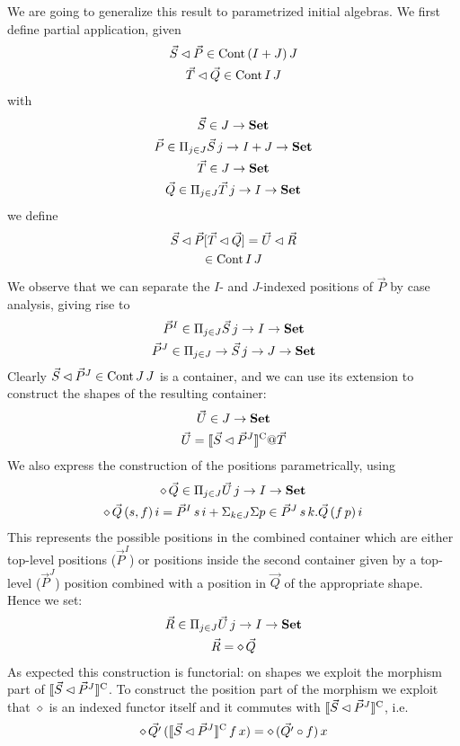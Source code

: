 \documentclass[10pt, conference, compsocconf]{IEEEtran}
\begin{document}
We are going to generalize this result to parametrized initial
algebras. We first define partial application, given 
\begin{gather*}
  \vec{S} \lhd \vec{P} \in \mathrm{Cont}\,(I+J)\,J\\
  \vec{T} \lhd \vec{Q} \in \mathrm{Cont}\,I\,J
\end{gather*}
with 
\begin{gather*}
  \vec{S} \in J\to\mathbf{Set}\\
  \vec{P} \in \Pi_{j\in J} \vec{S}\,j \to I+J \to \mathbf{Set}\\
  \vec{T} \in J\to\mathbf{Set}\\
  \vec{Q} \in \Pi_{j\in J} \vec{T}\,j \to I \to \mathbf{Set}
\end{gather*}
we define
\begin{gather*}
  \vec{S} \lhd \vec{P}[\vec{T} \lhd \vec{Q}] = \vec{U} \lhd \vec{R}\\
  \in \mathrm{Cont}\,I\,J
\end{gather*}
We observe that we can separate the $I$- and $J$-indexed positions of $\vec{P}$ by case analysis, giving rise to
\begin{gather*}
  \vec{P}^I \in \Pi_{j\in J} \vec{S}\,j \to I \to \mathbf{Set}\\
  \vec{P}^J \in \Pi_{j\in J} \to \vec{S}\,j \to J \to \mathbf{Set}\\
\end{gather*}
Clearly $\vec{S} \lhd \vec{P}^J \in \mathrm{Cont}\,J\,J$ is a container,
and we can use its extension to construct the shapes of the resulting
container:
\begin{gather*}
  \vec{U} \in J\to\mathbf{Set} \\
  \vec{U} = \llbracket\vec{S} \lhd \vec{P}^J\rrbracket^{\mathrm C} @ \vec{T}
\end{gather*}
We also express the construction of the positions parametrically, using
\begin{gather*}
  \diamond\,\vec{Q} \in \Pi_{j\in J} \vec{U}\,j \to I \to \mathbf{Set}\\
  \diamond\,\vec{Q}\,(s,f)\,i = \vec{P}^I\,s\,i +
  \Sigma_{k\in J}\Sigma p\in \vec{P}^J\,s\,k.\vec{Q}\,(f\,p)\,i
\end{gather*}
This represents the possible positions in the combined container which
are either top-level positions ($\vec{P}^I$) or positions inside the
second container given by a top-level ($\vec{P}^J$) position combined with a 
position in $\vec{Q}$ of the appropriate shape. Hence we set:
\begin{gather*}
  \vec{R} \in \Pi_{j\in J} \vec{U}\,j \to I \to \mathbf{Set}\\
  \vec{R} = \diamond\,\vec{Q}
\end{gather*}
As expected this construction is functorial: on shapes we exploit the
morphism part of $\llbracket\vec{S} \lhd \vec{P}^J\rrbracket^{\mathrm C}$. To construct the 
position part of the morphism we exploit that $\diamond$ is an indexed 
functor itself and it commutes with $\llbracket\vec{S} \lhd \vec{P}^J\rrbracket^{\mathrm C}$, i.e.
\begin{gather*}
  \diamond\,\vec{Q'}\,(\llbracket\vec{S} \lhd \vec{P}^J\rrbracket^{\mathrm C}\,f\,x)
  = \diamond\,(\vec{Q'}\circ f)\,x
\end{gather*}
\end{document}
